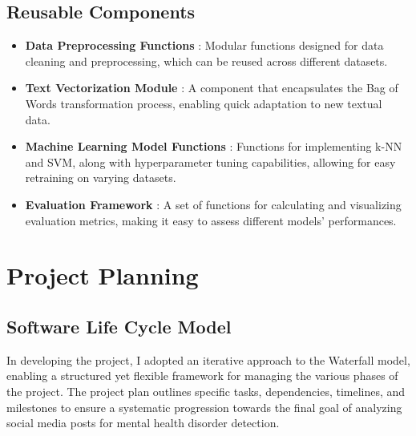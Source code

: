 \subsection{Reusable Components}
\begin{itemize}
    \item \textbf{Data Preprocessing Functions} :
    \noindent
    Modular functions designed for data cleaning and preprocessing, which can be reused across different datasets.
    \item \textbf{Text Vectorization Module} :
    \noindent
    A component that encapsulates the Bag of Words transformation process, enabling quick adaptation to new textual data.
    \item \textbf{Machine Learning Model Functions} :
    \noindent
    Functions for implementing k-NN and SVM, along with hyperparameter tuning capabilities, allowing for easy retraining on varying datasets.
    \item \textbf{Evaluation Framework} :
    \noindent
    A set of functions for calculating and visualizing evaluation metrics, making it easy to assess different models' performances.
\end{itemize}




\section{Project Planning}

\subsection{Software Life Cycle Model}
\noindent
In developing the project, I adopted an iterative approach to the Waterfall model, enabling a structured yet flexible framework for managing the various phases of the project. The project plan outlines specific tasks, dependencies, timelines, and milestones to ensure a systematic progression towards the final goal of analyzing social media posts for mental health disorder detection. \\

